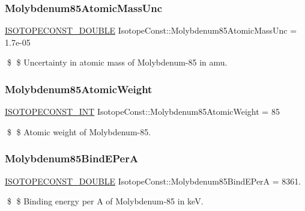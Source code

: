 \subsubsection{\texorpdfstring{Molybdenum85\+Atomic\+Mass\+Unc}{Molybdenum85AtomicMassUnc}}
{\footnotesize\ttfamily \mbox{\hyperlink{group___isotope_const-_macros_ga8f45a7272ce02c0b4c65c44636ed719a}{I\+S\+O\+T\+O\+P\+E\+C\+O\+N\+S\+T\+\_\+\+D\+O\+U\+B\+LE}} Isotope\+Const\+::\+Molybdenum85\+Atomic\+Mass\+Unc = 1.\+7e-\/05}

\$ \$ Uncertainty in atomic mass of Molybdenum-\/85 in amu. \mbox{\label{group___isotope_const-_molybdenum-_mo85_gaaa409c73213a32ac64914b02fd605df1}} 
\subsubsection{\texorpdfstring{Molybdenum85\+Atomic\+Weight}{Molybdenum85AtomicWeight}}
{\footnotesize\ttfamily \mbox{\hyperlink{group___isotope_const-_macros_ga5f18360b3e99483a35c32d789e62621c}{I\+S\+O\+T\+O\+P\+E\+C\+O\+N\+S\+T\+\_\+\+I\+NT}} Isotope\+Const\+::\+Molybdenum85\+Atomic\+Weight = 85}

\$ \$ Atomic weight of Molybdenum-\/85. \mbox{\label{group___isotope_const-_molybdenum-_mo85_ga85b39197a76bc3572adf10ccb117ab17}} 
\subsubsection{\texorpdfstring{Molybdenum85\+Bind\+E\+PerA}{Molybdenum85BindEPerA}}
{\footnotesize\ttfamily \mbox{\hyperlink{group___isotope_const-_macros_ga8f45a7272ce02c0b4c65c44636ed719a}{I\+S\+O\+T\+O\+P\+E\+C\+O\+N\+S\+T\+\_\+\+D\+O\+U\+B\+LE}} Isotope\+Const\+::\+Molybdenum85\+Bind\+E\+PerA = 8361.}

\$ \$ Binding energy per A of Molybdenum-\/85 in keV. \mbox{\label{group___isotope_const-_molybdenum-_mo85_ga4bee85c649124a65aab586b09bd0e993}} 
